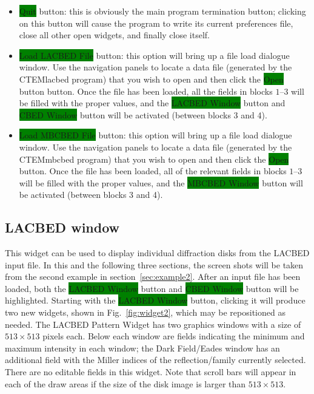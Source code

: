 \documentclass[DIV=calc, paper=letter, fontsize=11pt]{scrartcl}	 %
\newcommand{\button}[1]{\colorbox{green}{\textsf{#1}} button}
\begin{document}
\begin{itemize}
	\item \button{Quit}: this is obviously the main program termination button; clicking on this button will cause the program to write its
	current preferences file, close all other open widgets, and finally close itself.
	\item \button{Load LACBED File}: this option will bring up a file load dialogue window.  Use the navigation panels to locate a data file (generated
	by the \textsf{CTEMlacbed} program) that 	you wish to open and then click the \button{Open} button.  Once the file has been loaded, all the 
	fields in blocks $1$--$3$ will be filled with the proper values, and the \button{LACBED Window} and \button{CBED Window}  will be 
	activated (between blocks 3 and 4).
	\item \button{Load MBCBED File}: this option will bring up a file load dialogue window.  Use the navigation panels to locate a data file (generated
	by the \textsf{CTEMmbcbed} program) that you wish to open and then click the \button{Open}.  Once the file has been loaded, all of the relevant
	fields in blocks $1$--$3$ will be filled with the proper values, and the \button{MBCBED Window}  will be activated (between blocks 3 and 4).
\end{itemize}




\subsection{LACBED window\label{sec:idllacbed}}
This widget can be used to display individual diffraction disks from the LACBED input file.  In this and the following three sections, the screen shots
will be taken from the second example in section~\ref{sec:example2}.  After an input file has been loaded, both the \button{LACBED Window} and \button{CBED Window}
will be highlighted.  Starting with the \button{LACBED Window}, clicking it will produce two new widgets, shown in Fig.~\ref{fig:widget2}, 
which may be repositioned as needed. The LACBED Pattern
Widget has two graphics windows with a size of $513\times 513$ pixels each.  Below each window are fields indicating the minimum and maximum intensity
in each window; the Dark Field/Eades window has an additional field with the Miller indices of the reflection/family currently selected.  There are 
no editable fields in this widget.  Note that scroll bars will appear in each of the draw areas if the size of the disk image is larger 
than $513\times 513$.  
\end{document}
